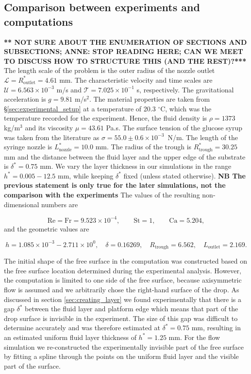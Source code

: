 \documentclass[aip,graphicx]{revtex4-1}
\newcommand{\sym}[1]{\text{#1}} \newcommand{\dif}{\mathrm{d}}
\begin{document}
\subsection{Comparison between experiments and computations}
{\bf *** NOT SURE ABOUT THE ENUMERATION OF SECTIONS AND SUBSECTIONS; 
ANNE: STOP READING HERE; CAN WE MEET TO DISCUSS HOW TO STRUCTURE
THIS (AND THE REST)?***}
The length scale of the problem is the outer radius of the nozzle
outlet $\mathcal{L}=R_{\sym{outlet}}^*=4.61$ mm.
The characteristic velocity and time scales are $\mathcal{U}=6.563
\times 10^{-3}$ m/s and $\mathcal{T}=7.025 \times 10^{-1}$ s,
respectively.
The gravitational acceleration is $g=9.81$ m/s$^2$.
The material properties are taken from \S \ref{sec:experimental_setup}
at a temperature of 20.3 $^{\circ}$C, which was the temperature
recorded for the experiment.
Hence, the fluid density is $\rho=1373$ kg/m$^3$ and its viscosity $\mu=43.61$
Pa.s.
The surface tension of the glucose syrup was taken from the 
literature \cite{montanez2013influence} as $\sigma=55.0 \pm 0.6 \times
10^{-3}$~N/m.
The length of the syringe nozzle is $L_{\sym{nozzle}}^*=10.0$ mm.
The radius of the trough is $R_{\sym{trough}}^*=30.25$ mm and the
distance between the fluid layer and the upper edge of the substrate
is $\delta^*=0.75$ mm.
We vary the layer thickness in our simulations in the range $h^*=0.005
- 12.5$ mm, while keeping $\delta^*$ fixed (unless stated otherwise).
{\bf NB The previous statement is only true for the later simulations,
not the comparison with the experiments}
The values of the resulting non-dimensional numbers are

\begin{equation}
 \sym{Re} = \sym{Fr} = 9.523 \times 10^{-4}, \qquad \sym{St}=1, \qquad
 \sym{Ca}=5.204,
\end{equation}
and the geometric values are

\begin{equation}
 h = 1.085 \times 10^{-3} - 2.711 \times 10^{0}, \quad \delta=0.16269, \quad R_{\sym{trough}}=6.562, \quad
 L_{\sym{outlet}}=2.169.
\end{equation}


The initial shape of the free surface in the computation was
constructed based on
the free surface location determined during the experimental analysis.
However, the computation is limited to one side of the free surface,
because axisymmetric flow is assumed and we arbitrarily chose the
right-hand surface of the drop.  As discussed in section
\ref{sec:creating_layer} we found experimentally that there is a gap
$\delta^*$ between the fluid layer and platform edge which means that
part of the drop surface is invisible in the experiment. The size of this gap was
difficult to determine accurately and was therefore estimated at
$\delta^*=0.75$ mm, resulting in an estimated uniform fluid layer
thickness of $h^*=1.25$ mm.
For the flow simulation we re-constructed the experimentally invisible
part of the free surface by fitting a spline through the points on the
uniform fluid layer and the visible part of the surface.
\end{document}
